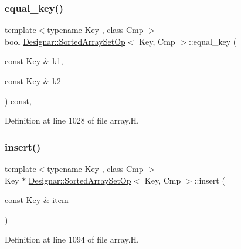 \subsubsection{\texorpdfstring{equal\+\_\+key()}{equal\_key()}}
{\footnotesize\ttfamily template$<$typename Key , class Cmp $>$ \\
bool \hyperlink{class_designar_1_1_sorted_array_set_op}{Designar\+::\+Sorted\+Array\+Set\+Op}$<$ Key, Cmp $>$\+::equal\+\_\+key (\begin{DoxyParamCaption}\item[{const Key \&}]{k1,  }\item[{const Key \&}]{k2 }\end{DoxyParamCaption}) const\hspace{0.3cm}{\ttfamily [inline]}, {\ttfamily [protected]}}



Definition at line 1028 of file array.\+H.

\mbox{\label{class_designar_1_1_sorted_array_set_op_aa23273a531de4a184c6a0bdf30816c79}} 
\subsubsection{\texorpdfstring{insert()}{insert()}\hspace{0.1cm}{\footnotesize\ttfamily [1/2]}}
{\footnotesize\ttfamily template$<$typename Key , class Cmp $>$ \\
Key $\ast$ \hyperlink{class_designar_1_1_sorted_array_set_op}{Designar\+::\+Sorted\+Array\+Set\+Op}$<$ Key, Cmp $>$\+::insert (\begin{DoxyParamCaption}\item[{const Key \&}]{item }\end{DoxyParamCaption})}



Definition at line 1094 of file array.\+H.

\mbox{\label{class_designar_1_1_sorted_array_set_op_a78058ddfd47003fc67d8a87068c5fc78}} 
